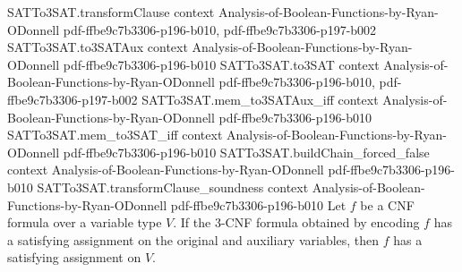 \begin{theorem}
  {SATTo3SAT.transformClause}
  {context}
  {Analysis-of-Boolean-Functions-by-Ryan-ODonnell}
  {pdf-ffbe9c7b3306-p196-b010,
    pdf-ffbe9c7b3306-p197-b002}
\proofstep
  {SATTo3SAT.to3SATAux}
  {context}
  {Analysis-of-Boolean-Functions-by-Ryan-ODonnell}
  {pdf-ffbe9c7b3306-p196-b010}
\proofstep
  {SATTo3SAT.to3SAT}
  {context}
  {Analysis-of-Boolean-Functions-by-Ryan-ODonnell}
  {pdf-ffbe9c7b3306-p196-b010,
    pdf-ffbe9c7b3306-p197-b002}
\proofstep
  {SATTo3SAT.mem_to3SATAux_iff}
  {context}
  {Analysis-of-Boolean-Functions-by-Ryan-ODonnell}
  {pdf-ffbe9c7b3306-p196-b010}
\proofstep
  {SATTo3SAT.mem_to3SAT_iff}
  {context}
  {Analysis-of-Boolean-Functions-by-Ryan-ODonnell}
  {pdf-ffbe9c7b3306-p196-b010}
\proofstep
  {SATTo3SAT.buildChain_forced_false}
  {context}
  {Analysis-of-Boolean-Functions-by-Ryan-ODonnell}
  {pdf-ffbe9c7b3306-p196-b010}
\proofstep
  {SATTo3SAT.transformClause_soundness}
  {context}
  {Analysis-of-Boolean-Functions-by-Ryan-ODonnell}
  {pdf-ffbe9c7b3306-p196-b010}
Let $f$ be a CNF formula over a variable type $V$. If the 3-CNF formula obtained by
encoding $f$ has a satisfying assignment on the original and auxiliary variables, then
$f$ has a satisfying assignment on $V$.
\end{theorem}

